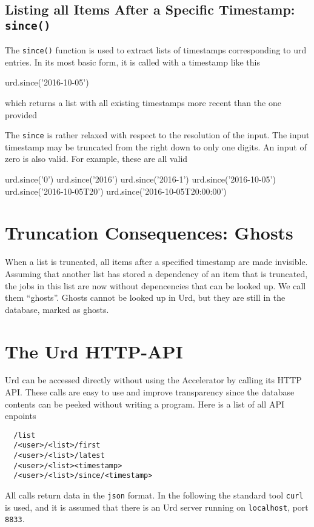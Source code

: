 \subsection{Listing all Items After a Specific Timestamp:  \texttt{since()}}
The \texttt{since()} function is used to extract lists of timestamps
corresponding to urd entries.  In its most basic form, it is called
with a timestamp like this
\begin{python}
urd.since('2016-10-05')
\end{python}
which returns a list with all existing timestamps more recent than the
one provided
\begin{shell}
['2016-10-06', '2016-10-07', '2016-10-08', '2016-10-09', '2016-10-09T20']
\end{shell}
The \texttt{since} is rather relaxed with respect to the resolution of
the input.  The input timestamp may be truncated from the right down
to only one digits.  An input of zero is also valid.  For example,
these are all valid
\begin{python}
urd.since('0')
urd.since('2016')
urd.since('2016-1')
urd.since('2016-10-05')
urd.since('2016-10-05T20')
urd.since('2016-10-05T20:00:00')
\end{python}



\section{Truncation Consequences:  Ghosts}
When a list is truncated, all items after a specified timestamp are
made invisible.  Assuming that another list has stored a dependency of
an item that is truncated, the jobs in this list are now without
depencencies that can be looked up.  We call them ``ghosts''.  Ghosts
cannot be looked up in Urd, but they are still in the database, marked
as ghosts.




\section{The Urd HTTP-API}

Urd can be accessed directly without using the Accelerator by calling
its HTTP API.  These calls are easy to use and improve transparency
since the database contents can be peeked without writing a program.
Here is a list of all API enpoints
\begin{verbatim}
  /list
  /<user>/<list>/first
  /<user>/<list>/latest
  /<user>/<list><timestamp>
  /<user>/<list>/since/<timestamp>
\end{verbatim}
All calls return data in the \texttt{json} format.  In the following
the standard tool \texttt{curl} is used, and it is assumed that there
is an Urd server running on \texttt{localhost}, port \texttt{8833}.


